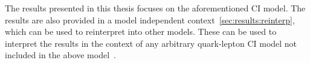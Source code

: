 The results presented in this thesis focuses on the aforementioned CI model. The results are also provided in a model independent context~\cref{sec:results:reinterp}, which can be used to reinterpret into other models. These can be used to interpret the results in the context of any arbitrary quark-lepton CI model not included in the above model~\cite{de_Blas_2013}.


